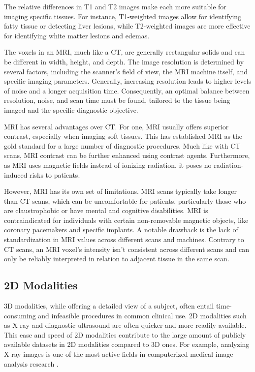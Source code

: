  The relative differences in T1 and T2 images make each more suitable for imaging specific tissues. For instance, T1-weighted images allow for identifying fatty tissue or detecting liver lesions, while T2-weighted images are more effective for identifying white matter lesions and edemas.
  
 The voxels in an MRI, much like a CT, are generally rectangular solids and can be different in width, height, and depth. The image resolution is determined by several factors, including the scanner's field of view, the MRI machine itself, and specific imaging parameters. Generally, increasing resolution leads to higher levels of noise and a longer acquisition time. Consequently, an optimal balance between resolution, noise, and scan time must be found, tailored to the tissue being imaged and the specific diagnostic objective.
 
 MRI has several advantages over CT. For one, MRI usually offers superior contrast, especially when imaging soft tissues. This has established MRI as the gold standard for a large number of diagnostic procedures. Much like with CT scans, MRI contrast can be further enhanced using contrast agents. Furthermore, as MRI uses magnetic fields instead of ionizing radiation, it poses no radiation-induced risks to patients.
 
However, MRI has its own set of limitations. MRI scans typically take longer than CT scans, which can be uncomfortable for patients, particularly those who are claustrophobic or have mental and cognitive disabilities. MRI is contraindicated for individuals with certain non-removable magnetic objects, like coronary pacemakers and specific implants. A notable drawback is the lack of standardization in MRI values across different scans and machines. Contrary to CT scans, an MRI voxel's intensity isn't consistent across different scans and can only be reliably interpreted in relation to adjacent tissue in the same scan.

\subsection{2D Modalities}

3D modalities, while offering a detailed view of a subject, often entail time-consuming and infeasible procedures in common clinical use. 2D modalities such as X-ray and diagnostic ultrasound are often quicker and more readily available. This ease and speed of 2D modalities contribute to the large amount of publicly available datasets in 2D modalities compared to 3D ones. For example, analyzing X-ray images is one of the most active fields in computerized medical image analysis research \cite{nguyen2020vindrcxr, irvinCheXpertLargeChest2019}.

